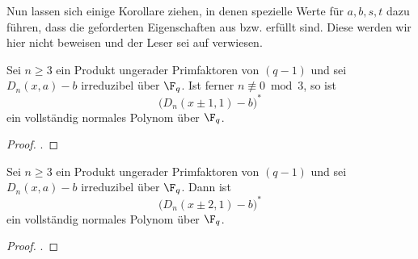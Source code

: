 Nun lassen sich einige Korollare ziehen, in denen spezielle Werte für $a,b,s,t$
dazu führen, dass die geforderten Eigenschaften aus 
 bzw.  erfüllt sind.
Diese werden wir hier nicht beweisen und der Leser sei auf
\autocite{scheerhorn:1997} verwiesen.


\begin{kor}
  Sei $n\geq 3$ ein Produkt ungerader Primfaktoren von $(q-1)$ und sei
  $D_n(x,a) -b$ irreduzibel über $\F_q$. Ist ferner $n\nequiv 0 \bmod 3$, so
  ist
  \[ \big(D_n(x\pm 1,1) -b\big)^\ast\]
  ein vollständig normales Polynom über $\F_q$.
\end{kor}
\begin{proof}
  \autocite[Corollary 2]{scheerhorn:1997}.
\end{proof}

\begin{kor}
  Sei $n\geq 3$ ein Produkt ungerader Primfaktoren von $(q-1)$ und sei
  $D_n(x,a) -b$ irreduzibel über $\F_q$. Dann ist
  \[ \big(D_n(x\pm 2,1) -b\big)^\ast\]
  ein vollständig normales Polynom über $\F_q$.
\end{kor}
\begin{proof}
  \autocite[Corollary 3]{scheerhorn:1997}.
\end{proof}



